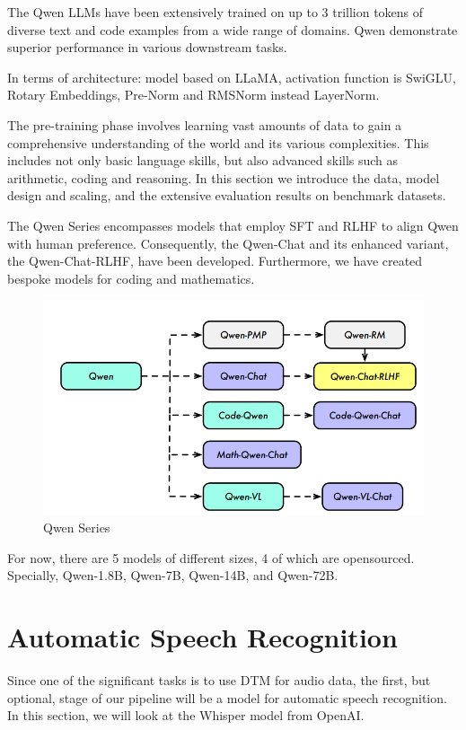 \documentclass[PMI,VKR]{HSEUniversity}
\begin{document}
The Qwen LLMs have been extensively trained on up to 3 trillion tokens of diverse text and code examples from a wide range of domains. 
Qwen demonstrate superior performance in various downstream tasks.

In terms of architecture: model based on LLaMA, activation function is SwiGLU, Rotary Embeddings, Pre-Norm and RMSNorm instead LayerNorm. 

The pre-training phase involves learning vast amounts of data to gain a comprehensive understanding of the world and its various complexities. 
This includes not only basic language skills, but also advanced skills such as arithmetic, coding and reasoning. 
In this section we introduce the data, model design and scaling, and the extensive evaluation results on benchmark datasets.

The Qwen Series encompasses models that employ SFT and RLHF to align Qwen with human preference. 
Consequently, the Qwen-Chat and its enhanced variant, the Qwen-Chat-RLHF, have been developed. Furthermore, we have created bespoke models for coding and mathematics.

\begin{figure}[h]
    \centering
    \includegraphics[scale=1]{img/qwen.png}
    \caption{Qwen Series}
\end{figure} 

For now, there are 5 models of different sizes, 4 of which are opensourced. Specially, Qwen-1.8B, Qwen-7B, Qwen-14B, and Qwen-72B.

\section{Automatic Speech Recognition}

Since one of the significant tasks is to use DTM for audio data, the first, but optional, stage of our pipeline will be a model for automatic speech recognition. 
In this section, we will look at the Whisper \cite{whisper:2022} model from OpenAI.
\end{document}
